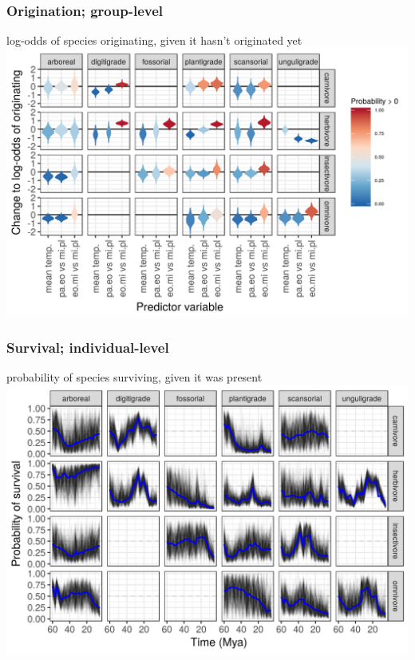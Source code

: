 \documentclass[aspectratio=169]{beamer}
\begin{document}
\begin{frame}
  \frametitle{Origination; group-level}
  \begin{center}
    log-odds of species originating, given it hasn't originated yet
    \includegraphics[height=0.775\textheight,width=\textwidth,keepaspectratio=true]{figure/group_on_origin_bd}
  \end{center}
\end{frame}

\begin{frame}
  \frametitle{Survival; individual-level}
  \begin{center}
    probability of species surviving, given it was present
    \includegraphics[height=0.775\textheight,width=\textwidth,keepaspectratio=true]{figure/ecotype_survival_bd}
  \end{center}
\end{frame}
\end{document}
